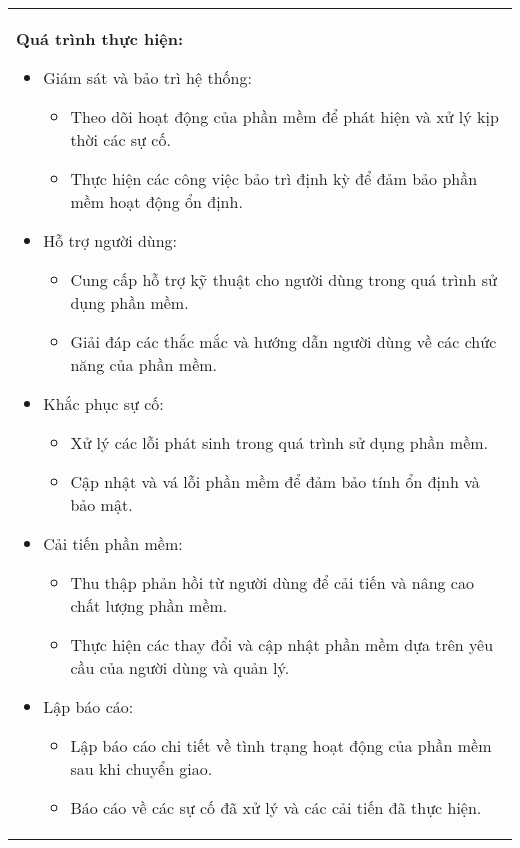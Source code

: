 \begin{longtable}{|p{\textwidth}|}
    \hline
    \begin{minipage}{\textwidth}
        \noindent\textbf{Quá trình thực hiện:}
        \begin{itemize}
            \item Giám sát và bảo trì hệ thống:
                  \begin{itemize}
                      \item Theo dõi hoạt động của phần mềm để phát hiện và xử lý kịp thời các sự cố.
                      \item Thực hiện các công việc bảo trì định kỳ để đảm bảo phần mềm hoạt động ổn định.
                  \end{itemize}
            \item  Hỗ trợ người dùng:
                  \begin{itemize}
                      \item Cung cấp hỗ trợ kỹ thuật cho người dùng trong quá trình sử dụng phần mềm.
                      \item Giải đáp các thắc mắc và hướng dẫn người dùng về các chức năng của phần mềm.
                  \end{itemize}
            \item Khắc phục sự cố:
                  \begin{itemize}
                      \item Xử lý các lỗi phát sinh trong quá trình sử dụng phần mềm.
                      \item Cập nhật và vá lỗi phần mềm để đảm bảo tính ổn định và bảo mật.
                  \end{itemize}
            \item  Cải tiến phần mềm:
                  \begin{itemize}
                      \item Thu thập phản hồi từ người dùng để cải tiến và nâng cao chất lượng phần mềm.
                      \item Thực hiện các thay đổi và cập nhật phần mềm dựa trên yêu cầu của người dùng và quản lý.
                  \end{itemize}
            \item Lập báo cáo:
                  \begin{itemize}
                      \item Lập báo cáo chi tiết về tình trạng hoạt động của phần mềm sau khi chuyển giao.
                      \item Báo cáo về các sự cố đã xử lý và các cải tiến đã thực hiện.
                  \end{itemize}
        \end{itemize}


\end{minipage}
\end{longtable}
